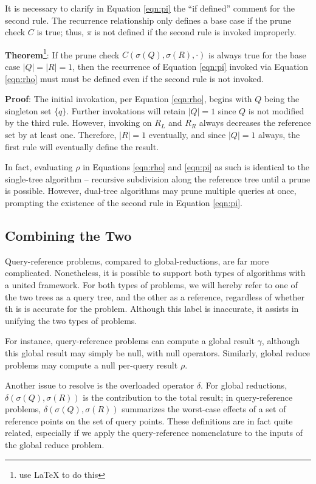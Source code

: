 \documentclass[times, 10pt,twocolumn]{article}
\begin{document}
It is necessary to clarify in Equation \ref{eqn:pi} the ``if defined'' comment for the second rule.
The recurrence relationship only defines a base case if the prune check $C$ is true; thus, $\pi$ is not defined if the second rule is invoked improperly.

{\bf Theorem}\footnote{use LaTeX to do this}: If the prune check $C(\sigma(Q), \sigma(R), \cdot)$ is always true for the base case $|Q| = |R| = 1$, then the recurrence of Equation \ref{eqn:pi} invoked via Equation \ref{eqn:rho} must must be defined even if the second rule is not invoked.

{\bf Proof}: The initial invokation, per Equation \ref{eqn:rho}, begins with $Q$ being the singleton set $\{q\}$.  Further invokations will retain $|Q| = 1$ since $Q$ is not modified by the third rule.  However, invoking on $R_L$ and $R_R$ always decreases the reference set by at least one.  Therefore, $|R| = 1$ eventually, and since $|Q| = 1$ always, the first rule will eventually define the result.

In fact, evaluating $\rho$ in Equations \ref{eqn:rho} and \ref{eqn:pi} as such is identical to the single-tree algorithm -- recursive subdivision along the reference tree until a prune is possible.
However, dual-tree algorithms may prune multiple queries at once, prompting the existence of the second rule in Equation \ref{eqn:pi}.

\subsection{Combining the Two}

Query-reference problems, compared to global-reductions, are far more complicated.
Nonetheless, it is possible to support both types of algorithms with a united framework.
For both types of problems, we will hereby refer to one of the two trees as a query tree, and the other as a reference, regardless of whether th is is accurate for the problem.
Although this label is inaccurate, it assists in unifying the two types of problems.

For instance, query-reference problems can compute a global result $\gamma$, although this global result may simply be null, with null operators.
Similarly, global reduce problems may compute a null per-query result $\rho$.

Another issue to resolve is the overloaded operator $\delta$.
For global reductions, $\delta(\sigma(Q), \sigma(R))$ is the contribution to the total result; in query-reference problems, $\delta(\sigma(Q), \sigma(R))$ summarizes the worst-case effects of a set of reference points on the set of query points.
These definitions are in fact quite related, especially if we apply the query-reference nomenclature to the inputs of the global reduce problem.
\end{document}

